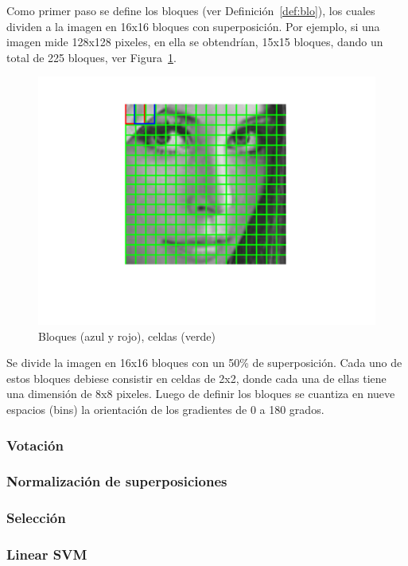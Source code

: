 Como primer paso se define los bloques (ver Definición~\ref{def:blo}), los cuales dividen a la imagen en 16x16 bloques con superposición. Por ejemplo, si una imagen mide 128x128 pixeles, en ella se obtendrían, 15x15 bloques, dando un total de 225 bloques, ver Figura~\ref{fig:blocks_cells}.
\begin{figure}[tb]
  \centering
   \includegraphics[width=1\textwidth]{Figuras/lena-grid.png}
   \caption{Bloques (azul y rojo), celdas (verde)}
   \label{fig:blocks_cells}
\end{figure}
Se divide la imagen en 16x16 bloques con un 50\% de superposición. Cada uno de estos bloques debiese consistir en celdas de 2x2, donde cada una de ellas tiene una dimensión de 8x8 pixeles. Luego de definir los bloques se cuantiza en nueve espacios (bins) la orientación de los gradientes de 0 a 180 grados. 
\subsubsection{Votación}

\subsubsection{Normalización de superposiciones}

\subsubsection{Selección}

\subsubsection{Linear SVM}

